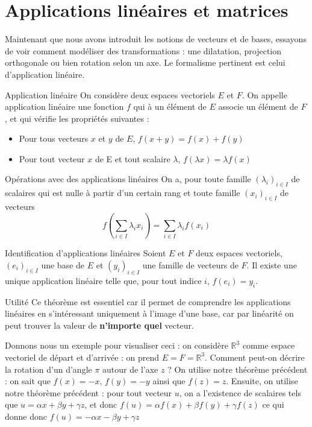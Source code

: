 \documentclass{classe}
\begin{document}

\section{Applications linéaires et matrices}

Maintenant que nous avons introduit les notions de vecteurs et de bases, essayons de voir comment modéliser des transformations : une dilatation, projection orthogonale ou bien rotation selon un axe. Le formalisme pertinent est celui d'application linéaire.

\begin{définition}{Application linéaire}{}
On considère deux espaces vectoriels $E$ et $F$. On appelle application linéaire une fonction $f$ qui à un élément de $E$ associe un élément de $F$, et qui vérifie les propriétés suivantes :
\begin{itemize}
	\item Pour tous vecteurs $x$ et $y$ de $E$, $f(x+y) = f(x)+f(y)$
	\item Pour tout vecteur $x$ de E et tout scalaire $\lambda$, $f(\lambda x) = \lambda f(x)$
\end{itemize}
\end{définition}

\begin{propositionfr}{Opérations avec des applications linéaires}{}
On a, pour toute famille $(\lambda_i)_{i\in I}$ de scalaires qui est nulle à partir d'un certain rang et toute famille $(x_i)_{i\in I}$ de vecteurs
$$f\left(\sum_{i\in I}\lambda_i x_i\right) = \sum_{i\in I}\lambda_i f(x_i)$$
\end{propositionfr}

\begin{théorème}{Identification d'applications linéaires}{}
Soient $E$ et $F$ deux espaces vectoriels, $(e_i)_{i\in I}$ une base de $E$ et $(y_i)_{i\in I}$ une famille de vecteurs de $F$. Il existe une unique application linéaire telle que, pour tout indice $i$, $f(e_i) = y_i$.
\end{théorème}



\begin{remarque}{Utilité}{}
Ce théorème est essentiel car il permet de comprendre les applications linéaires en s'intéressant uniquement à l'image d'une base, car par linéarité on peut trouver la valeur de \textbf{n'importe quel} vecteur.
\end{remarque}

Donnons nous un exemple pour visualiser ceci : on considère $\mathbb{R}^3$ comme espace vectoriel de départ et d'arrivée : on prend $E = F = \mathbb{R}^3$. Comment peut-on décrire la rotation d'un d'angle $\pi$ autour de l'axe $z$ ? On utilise notre théorème précédent : on sait que $f(x) = -x$, $f(y) = -y$ ainsi que $f(z) = z$. Ensuite, on utilise notre théorème précédent : pour tout vecteur $u$, on a l'existence de scalaires tels que $u = \alpha x + \beta y + \gamma z$, et donc $f(u) = \alpha f(x) + \beta f(y) + \gamma f(z)$ ce qui donne donc $f(u) = -\alpha x - \beta y + \gamma z$

\end{document}
